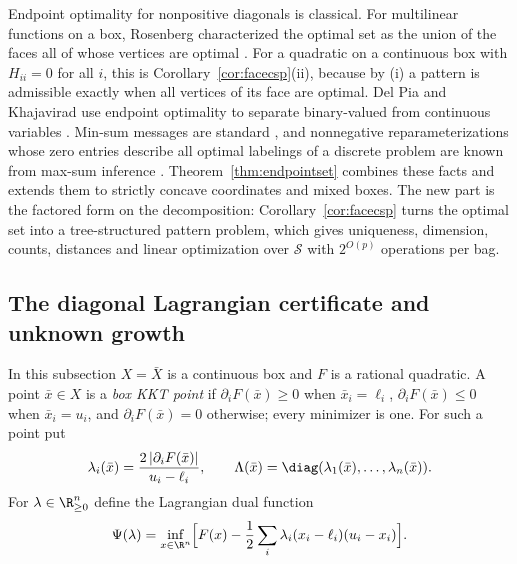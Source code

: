 Endpoint optimality for nonpositive diagonals is classical. For multilinear
functions on a box, Rosenberg characterized the optimal set as the union of
the faces all of whose vertices are optimal \cite{Rosenberg1972}. For a
quadratic on a continuous box with $H_{ii}=0$ for all $i$, this is
Corollary~\ref{cor:facecsp}(ii), because by (i) a pattern is admissible
exactly when all vertices of its face are optimal. Del Pia and
Khajavirad use endpoint optimality to separate binary-valued from continuous
variables \cite{DelPiaKhajavirad2026}. Min-sum messages are standard
\cite{Dechter1999}, and nonnegative reparameterizations whose zero entries
describe all optimal labelings of a discrete problem are known from max-sum
inference \cite{WainwrightJaakkolaWillsky2005,Werner2007}.
Theorem~\ref{thm:endpointset} combines these facts and extends them to
strictly concave coordinates and mixed boxes. The new part is the factored
form on the decomposition: Corollary~\ref{cor:facecsp} turns the optimal set
into a tree-structured pattern problem, which gives uniqueness, dimension,
counts, distances and linear optimization over $\mathcal S$ with $2^{O(p)}$
operations per bag.

\subsection{The diagonal Lagrangian certificate and unknown growth}\label{sec:diagcert}

In this subsection $X=\bar X$ is a continuous box and $F$ is a rational
quadratic. A point $\bar x\in X$ is a \emph{box KKT point} if
$\partial_iF(\bar x)\ge0$ when $\bar x_i=\ell_i$, $\partial_iF(\bar x)\le0$
when $\bar x_i=u_i$, and $\partial_iF(\bar x)=0$ otherwise; every minimizer
is one. For such a point put
\[
\lambda_i(\bar x)=\frac{2\,|\partial_iF(\bar x)|}{u_i-\ell_i},\qquad
\Lambda(\bar x)=\diag(\lambda_1(\bar x),\ldots,\lambda_n(\bar x)).
\]
For $\lambda\in\R^n_{\ge0}$ define the Lagrangian dual function
\[
\Psi(\lambda)=\inf_{x\in\R^n}\Bigl[F(x)-\frac12\sum_i\lambda_i(x_i-\ell_i)(u_i-x_i)\Bigr].
\]

